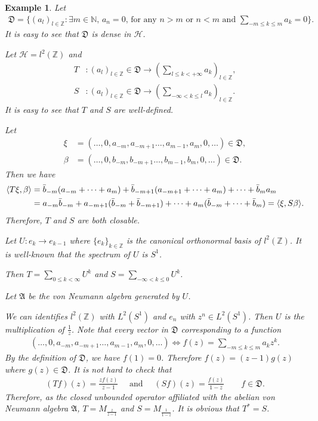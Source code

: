 \documentclass[a4paper,10pt]{amsart}
\newtheorem{example}{Example}[section]
\newcommand{\AAA}{\mathfrak A}
\newcommand{\HHH}{\mathcal H} %
\newcommand{\DDD}{\mathfrak D}
\newcommand{\Z}{\mathbb Z} %
\newcommand{\N}{\mathbb N} %
\begin{document}
\begin{example}
Let
\begin{align*}
    \DDD = \{(a_l)_{l \in \Z} : \mbox{$\exists m \in \N$, $a_n = 0$,
            for any $n > m$ or $n < m$ and 
$\sum_{-m \leq k \leq m}a_{k} = 0$}\}. 
\end{align*}
It is easy to see that $\DDD$ is dense in $\HHH$.

Let $\HHH = l^{2}(\Z)$ and 
\begin{align*}
    T &: (a_l)_{l \in \Z} \in \DDD \to 
    (\sum_{l \leq k <+\infty} a_k)_{l \in \Z},\\
    S &: (a_l)_{l \in \Z} \in \DDD \to 
    (\sum_{-\infty < k \leq l}a_k)_{l \in \Z}.
\end{align*}
It is easy to see that $T$ and $S$ are well-defined. 

Let 
\begin{align*}
\xi &= (\ldots, 0, a_{-m}, a_{-m+1} \ldots, a_{m-1}, a_{m}, 0, \ldots) 
\in \DDD, \\  
\beta &= (\ldots, 0, b_{-m}, b_{-m+1} \ldots, b_{m-1}, b_{m}, 0, \ldots)
\in \DDD.
\end{align*}
Then we have
\begin{align*}
    \langle T\xi, \beta \rangle &= \Bar{b}_{-m}(a_{-m} + \cdots + a_{m})
    + \Bar{b}_{-m+1}(a_{-m+1} + \cdots + a_{m}) + \cdots + 
    \Bar{b}_{m}a_m \\
    & = a_{-m}\Bar{b}_{-m} + a_{-m+1}(\Bar{b}_{-m} + \Bar{b}_{-m+1}) 
    + \cdots + 
    a_{m}(\Bar{b}_{-m} + \cdots + \Bar{b}_{m}) = 
    \langle \xi, S\beta \rangle.
\end{align*}
Therefore, $T$ and $S$ are both closable.

Let $U: e_{k} \to e_{k-1}$ where $\{e_{k}\}_{k \in \Z }$ is the canonical 
orthonormal basis of $l^{2}(\Z)$. It is well-known that the 
spectrum of $U$ is $S^{1}$.

Then $T = \sum_{0 \leq k <\infty} U^{k}$ and 
$S = \sum_{-\infty < k \leq 0} U^{k}$.

Let $\AAA$ be the von Neumann algebra generated by $U$.

We can identifies $l^{2}(\Z)$ with $L^{2}(S^{1})$ and 
$e_n$ with $z^{n} \in L^{2}(S^{1})$. Then $U$ is the multiplication of 
$\frac{1}{z}$. Note that every vector in $\DDD$ corresponding to a 
function 
\begin{align*}
    (\ldots, 0, a_{-m}, a_{-m+1} \ldots, a_{m-1}, a_{m}, 0, \ldots) 
    \Longleftrightarrow f(z) = \sum_{-m \leq k \leq m}a_k z^{k}.
\end{align*}
By the definition of $\DDD$, we have $f(1) = 0$. Therefore
$f(z) = (z-1)g(z)$ where $g(z) \in \DDD$. It is not hard to check that
\begin{align*}
 (Tf)(z) = \frac{zf(z)}{z-1} \quad \mbox{ and } \quad 
 (Sf)(z) = \frac{f(z)}{1-z} 
\qquad f \in \DDD.   
\end{align*}
Therefore, as the closed unbounded operator affiliated with the abelian
von Neumann algebra $\AAA$, $T = M_{\frac{z}{z-1}}$ and 
$S = M_{\frac{1}{1-z}}$. It is obvious that $T^{*} = S$.


\end{example}
\end{document}
